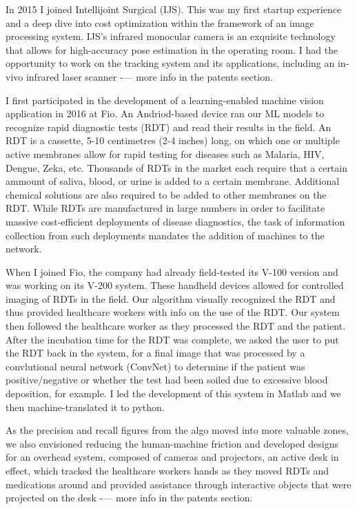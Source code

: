 \vspace{0.5cm}
In 2015 I joined Intellijoint Surgical (IJS). This was my first startup experience and a deep dive into cost optimization within the framework of an image processing system. IJS's infrared monocular camera is an exquisite technology that allows for high-accuracy pose estimation in the operating room. I had the opportunity to work on the tracking system and its applications, including an in-vivo infrared laser scanner -— more info in the patents section.

\vspace{0.5cm}
I first participated in the development of a learning-enabled machine vision application in 2016 at Fio. An Andriod-based device ran our ML models to recognize rapid diagnostic tests (RDT) and read their results in the field. An RDT is a cassette, 5-10 centimetres (2-4 inches) long, on which one or multiple active membranes allow for rapid testing for diseases such as Malaria, HIV, Dengue, Zeka, etc. Thousands of RDTs in the market each require that a certain ammount of saliva, blood, or urine is added to a certain membrane. Additional chemical solutions are also required to be added to other membranes on the RDT. While RDTs are manufactured in large numbers in order to facilitate massive cost-efficient deployments of disease diagnostics, the task of information collection from such deployments mandates the addition of machines to the network. 

\vspace{0.5cm}
When I joined Fio, the company had already field-tested its V-100 version and was working on its V-200 system. These handheld devices allowed for controlled imaging of RDTs in the field. Our algorithm visually recognized the RDT and thus provided healthcare workers with info on the use of the RDT. Our system then followed the healthcare worker as they processed the RDT and the patient. After the incubation time for the RDT was complete, we asked the user to put the RDT back in the system, for a final image that was processed by a convlutional neural network (ConvNet) to determine if the patient was positive/negative or whether the test had been soiled due to excessive blood deposition, for example. I led the development of this system in Matlab and we then machine-translated it to python. 
 
\vspace{0.5cm}
As the precision and recall figures from the algo moved into more valuable zones, we also envisioned reducing the human-machine friction and developed designs for an overhead system, composed of cameras and projectors, an active desk in effect, which tracked the healthcare workers hands as they moved RDTs and medications around and provided assistance through interactive objects that were projected on the desk -— more info in the patents section.

